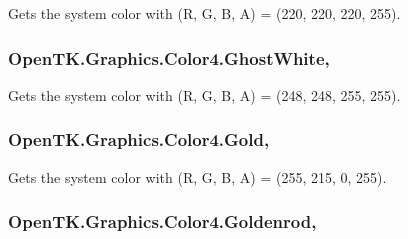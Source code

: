 Gets the system color with (R, G, B, A) = (220, 220, 220, 255). 

\hypertarget{struct_open_t_k_1_1_graphics_1_1_color4_ae35519e478d170106a9c47861472833f}{
\subsubsection[{Ghost\-White}]{ Open\-T\-K.\-Graphics.\-Color4.\-Ghost\-White\hspace{0.3cm}{\ttfamily [static]}, {\ttfamily [get]}}}\label{struct_open_t_k_1_1_graphics_1_1_color4_ae35519e478d170106a9c47861472833f}


Gets the system color with (R, G, B, A) = (248, 248, 255, 255). 

\hypertarget{struct_open_t_k_1_1_graphics_1_1_color4_a24bf2835cecd41b83e0cdcaf1adb2338}{
\subsubsection[{Gold}]{ Open\-T\-K.\-Graphics.\-Color4.\-Gold\hspace{0.3cm}{\ttfamily [static]}, {\ttfamily [get]}}}\label{struct_open_t_k_1_1_graphics_1_1_color4_a24bf2835cecd41b83e0cdcaf1adb2338}


Gets the system color with (R, G, B, A) = (255, 215, 0, 255). 

\hypertarget{struct_open_t_k_1_1_graphics_1_1_color4_a2fd0f77585749040dc451eb909ecce05}{
\subsubsection[{Goldenrod}]{ Open\-T\-K.\-Graphics.\-Color4.\-Goldenrod\hspace{0.3cm}{\ttfamily [static]}, {\ttfamily [get]}}}\label{struct_open_t_k_1_1_graphics_1_1_color4_a2fd0f77585749040dc451eb909ecce05}


